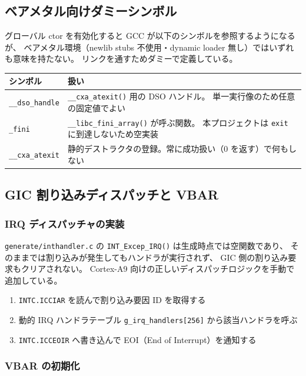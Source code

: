 \documentclass[a4paper,11pt,dvipdfmx]{jsarticle}
\begin{document}
\subsection{ベアメタル向けダミーシンボル}\label{sec:dummysym}

グローバル ctor を有効化すると GCC が以下のシンボルを参照するようになるが、
ベアメタル環境（newlib stubs 不使用・dynamic loader 無し）ではいずれも意味を持たない。
リンクを通すためダミーで定義している。

\begin{tabularx}{\textwidth}{l X}
\toprule
\textbf{シンボル} & \textbf{扱い} \\
\midrule
\texttt{\_\_dso\_handle} & \texttt{\_\_cxa\_atexit()} 用の DSO ハンドル。
  単一実行像のため任意の固定値でよい \\
\texttt{\_fini}          & \texttt{\_\_libc\_fini\_array()} が呼ぶ関数。
  本プロジェクトは \texttt{exit} に到達しないため空実装 \\
\texttt{\_\_cxa\_atexit} & 静的デストラクタの登録。常に成功扱い（0 を返す）で何もしない \\
\bottomrule
\end{tabularx}

\subsection{GIC 割り込みディスパッチと VBAR}\label{sec:gic}

\subsubsection{IRQ ディスパッチャの実装}

\texttt{generate/inthandler.c} の \texttt{INT\_Excep\_IRQ()} は生成時点では空関数であり、
そのままでは割り込みが発生してもハンドラが実行されず、
GIC 側の割り込み要求もクリアされない。
Cortex-A9 向けの正しいディスパッチロジックを手動で追加している。

\begin{enumerate}[nosep, leftmargin=*]
  \item \texttt{INTC.ICCIAR} を読んで割り込み要因 ID を取得する
  \item 動的 IRQ ハンドラテーブル \texttt{g\_irq\_handlers[256]} から該当ハンドラを呼ぶ
  \item \texttt{INTC.ICCEOIR} へ書き込んで EOI（End of Interrupt）を通知する
\end{enumerate}

\subsubsection{VBAR の初期化}
\end{document}
